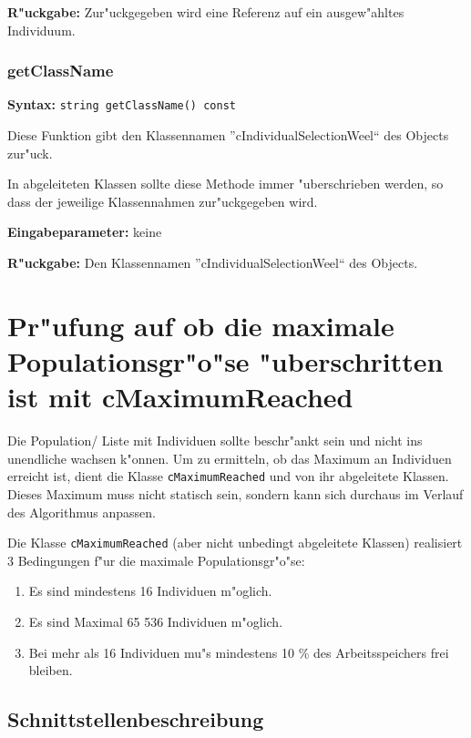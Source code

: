 \bigskip\noindent
\textbf{R"uckgabe:} Zur"uckgegeben wird eine Referenz auf ein ausgew"ahltes Individuum.


\subsubsection{getClassName}

\textbf{Syntax:} \verb|string getClassName() const|

\bigskip\noindent
Diese Funktion gibt den Klassennamen ''cIndividualSelectionWeel`` des Objects zur"uck.

In abgeleiteten Klassen sollte diese Methode immer "uberschrieben werden, so dass der jeweilige Klassennahmen zur"uckgegeben wird.

\bigskip\noindent
\textbf{Eingabeparameter:} keine

\bigskip\noindent
\textbf{R"uckgabe:} Den Klassennamen ''cIndividualSelectionWeel`` des Objects.



\section{Pr"ufung auf ob die maximale Populationsgr"o"se "uberschritten ist mit cMaximumReached}
\label{secMaxPopulation}\label{secCMaximumReached}

Die Population/ Liste mit Individuen sollte beschr"ankt sein und nicht ins unendliche wachsen k"onnen. Um zu ermitteln, ob das Maximum an Individuen erreicht ist, dient die Klasse \verb|cMaximumReached| und von ihr abgeleitete Klassen. Dieses Maximum muss nicht statisch sein, sondern kann sich durchaus im Verlauf des Algorithmus anpassen.

Die Klasse \verb|cMaximumReached| (aber nicht unbedingt abgeleitete Klassen) realisiert 3 Bedingungen f"ur die maximale Populationsgr"o"se:
\begin{enumerate}
 \item Es sind mindestens 16 Individuen m"oglich.
 \item Es sind Maximal 65 536 Individuen m"oglich.
 \item Bei mehr als 16 Individuen mu"s mindestens 10 \% des Arbeitsspeichers frei bleiben.
\end{enumerate}


\subsection{Schnittstellenbeschreibung}

